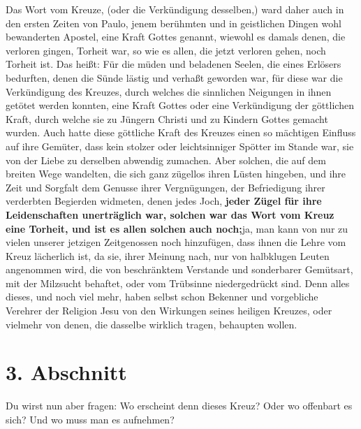 Das Wort vom Kreuze, (oder die Verkündigung desselben,) ward daher auch in den
ersten Zeiten von Paulo, jenem berühmten und in geistlichen Dingen wohl
bewanderten Apostel, eine Kraft Gottes genannt, wiewohl es damals denen, die
verloren gingen, Torheit war, so wie es allen, die jetzt verloren gehen, noch
Torheit ist. Das heißt: Für die müden und beladenen Seelen, die eines Erlösers
bedurften, denen die Sünde lästig und verhaßt geworden war, für diese war die
Verkündigung des Kreuzes, durch welches die sinnlichen Neigungen in ihnen
getötet werden konnten, eine Kraft Gottes oder eine Verkündigung der göttlichen
Kraft, durch welche sie zu Jüngern Christi und zu Kindern Gottes gemacht wurden.
Auch hatte diese göttliche Kraft des Kreuzes einen so mächtigen Einfluss auf ihre
Gemüter, dass kein stolzer oder leichtsinniger Spötter im Stande war, sie von
der Liebe zu derselben abwendig zumachen. Aber solchen, die auf dem breiten Wege
wandelten, die sich ganz zügellos ihren Lüsten hingeben, und ihre Zeit und
Sorgfalt dem Genusse ihrer Vergnügungen, der Befriedigung ihrer verderbten
Begierden widmeten, denen jedes Joch, \label{ref:03_02_leidenschaft}
\textbf{jeder Zügel für ihre Leidenschaften
unerträglich war, solchen war das Wort vom Kreuz eine Torheit, und ist es
allen solchen auch noch;}ja, man kann von nur zu vielen unserer jetzigen
Zeitgenossen noch hinzufügen, dass ihnen die Lehre vom Kreuz lächerlich ist, da
sie, ihrer Meinung nach, nur von halbklugen Leuten angenommen wird, die von
beschränktem Verstande und sonderbarer Gemütsart, mit der Milzsucht
 behaftet,
oder vom Trübsinne niedergedrückt sind. Denn alles dieses, und noch viel mehr,
haben selbst schon Bekenner und vorgebliche Verehrer der Religion Jesu von den
Wirkungen seines heiligen Kreuzes, oder vielmehr von denen, die dasselbe
wirklich tragen, behaupten wollen.

\section{3. Abschnitt} \label{kap3_ab3}

Du wirst nun aber fragen: Wo erscheint denn dieses Kreuz? Oder wo offenbart es
sich? Und wo muss man es aufnehmen?

\medskip

